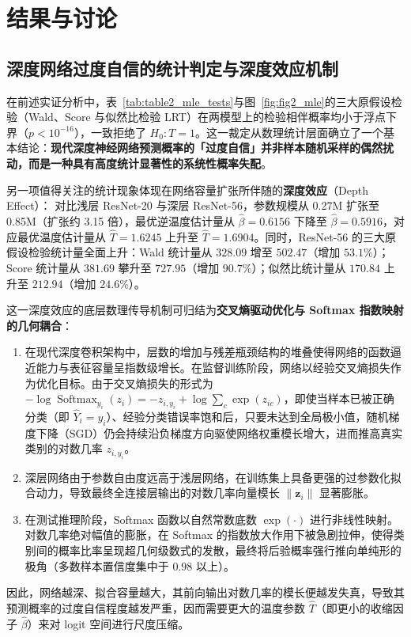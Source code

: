 \section{结果与讨论}\label{sec:discussion}

\subsection{深度网络过度自信的统计判定与深度效应机制}

在前述实证分析中，表~\ref{tab:table2_mle_tests}与图~\ref{fig:fig2_mle}的三大原假设检验（Wald、Score 与似然比检验 LRT）在两模型上的检验相伴概率均小于浮点下界（$p < 10^{-16}$），一致拒绝了 $H_0: T=1$。这一裁定从数理统计层面确立了一个基本结论：\textbf{现代深度神经网络预测概率的「过度自信」并非样本随机采样的偶然扰动，而是一种具有高度统计显著性的系统性概率失配}。

另一项值得关注的统计现象体现在网络容量扩张所伴随的\textbf{深度效应}（Depth Effect）：
对比浅层 ResNet-20 与深层 ResNet-56，参数规模从 0.27M 扩张至 0.85M（扩张约 3.15 倍），最优逆温度估计量从 $\hat\beta = 0.6156$ 下降至 $\hat\beta = 0.5916$，对应最优温度估计量从 $\hat T = 1.6245$ 上升至 $\hat T = 1.6904$。同时，ResNet-56 的三大原假设检验统计量全面上升：Wald 统计量从 $328.09$ 增至 $502.47$（增加 $53.1\%$）；Score 统计量从 $381.69$ 攀升至 $727.95$（增加 $90.7\%$）；似然比统计量从 $170.84$ 上升至 $212.94$（增加 $24.6\%$）。

这一深度效应的底层数理传导机制可归结为\textbf{交叉熵驱动优化与 Softmax 指数映射的几何耦合}：
\begin{enumerate}
\item 在现代深度卷积架构中，层数的增加与残差瓶颈结构的堆叠使得网络的函数逼近能力与表征容量呈指数级增长。在监督训练阶段，网络以经验交叉熵损失作为优化目标。由于交叉熵损失的形式为 $-\log \operatorname{Softmax}_{y_i}(z_i) = -z_{i, y_i} + \log \sum_c \exp(z_{ic})$，即使当样本已被正确分类（即 $\hat Y_i = y_i$）、经验分类错误率饱和后，只要未达到全局极小值，随机梯度下降（SGD）仍会持续沿负梯度方向驱使网络权重模长增大，进而推高真实类别的对数几率 $z_{i, y_i}$。
\item 深层网络由于参数自由度远高于浅层网络，在训练集上具备更强的过参数化拟合动力，导致最终全连接层输出的对数几率向量模长 $\|\boldsymbol{z}_i\|$ 显著膨胀。
\item 在测试推理阶段，Softmax 函数以自然常数底数 $\exp(\cdot)$ 进行非线性映射。对数几率绝对幅值的膨胀，在 Softmax 的指数放大作用下被急剧拉伸，使得类别间的概率比率呈现超几何级数式的发散，最终将后验概率强行推向单纯形的极角（多数样本置信度集中于 $0.98$ 以上）。
\end{enumerate}
因此，网络越深、拟合容量越大，其前向输出对数几率的模长便越发失真，导致其预测概率的过度自信程度越发严重，因而需要更大的温度参数 $\hat T$（即更小的收缩因子 $\hat\beta$）来对 logit 空间进行尺度压缩。

